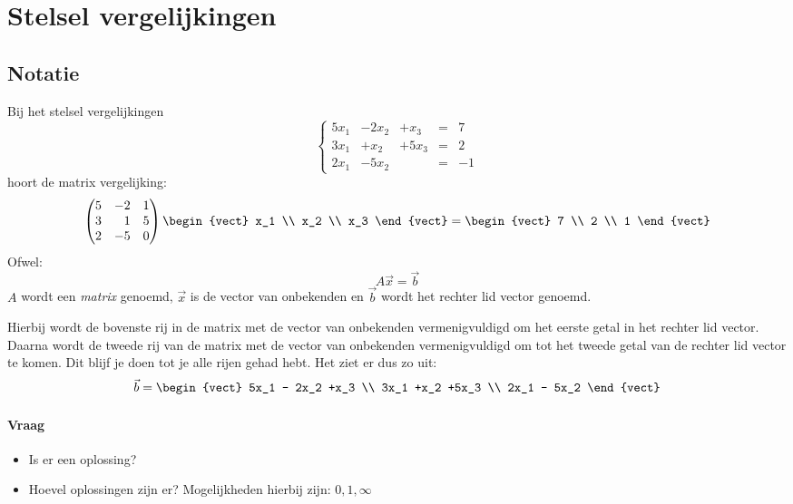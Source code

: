 \section{Stelsel vergelijkingen}
\subsection{Notatie}
Bij het stelsel vergelijkingen
\[ \left\{ \begin{array}{ccccc}
	5x_1 & - 2x_2 & +x_3 & = & 7 \\
	3x_1 & +x_2 & +5x_3 & = & 2 \\
	2x_1 & -5x_2 & & = & -1
\end{array} \right. \]
hoort de matrix vergelijking:
\[ \begin{pmatrix*}[r]
	5 & -2 & 1 \\
	3 & 1 & 5 \\
	2 & -5 & 0
\end{pmatrix*} \begin{vect} x_1 \\ x_2 \\ x_3 \end{vect} = \begin{vect} 7 \\ 2 \\ 1 \end{vect} \]
Ofwel:
\[ A \vec{x} = \vec{b} \]
$A$ wordt een \emph{matrix}  genoemd, $\vec{x}$ is de vector van onbekenden en $\vec{b}$ wordt het rechter lid vector genoemd.

Hierbij wordt de bovenste rij in de matrix met de vector van onbekenden vermenigvuldigd om het eerste getal in het rechter lid vector. Daarna wordt de tweede rij van de matrix met de vector van onbekenden vermenigvuldigd om tot het tweede getal van de rechter lid vector te komen. Dit blijf je doen tot je alle rijen gehad hebt. Het ziet er dus zo uit:
\[ \vec{b} = \begin{vect} 5x_1 - 2x_2 +x_3 \\
	3x_1 +x_2 +5x_3 \\
	2x_1 - 5x_2 \end{vect} \]

\paragraph{Vraag} \begin{itemize}
	\item Is er een oplossing?
	\item Hoevel oplossingen zijn er? Mogelijkheden hierbij zijn: $0, 1, \infty$
\end{itemize}

